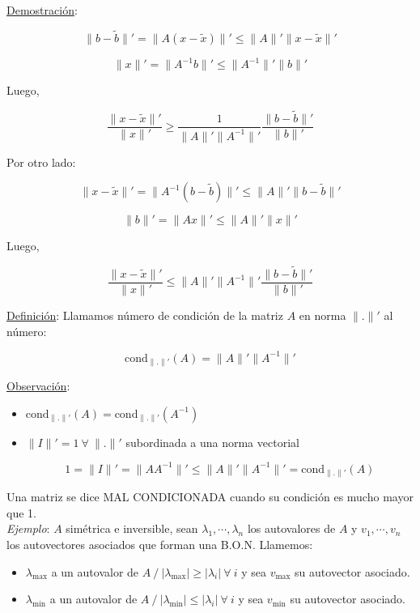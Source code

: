 \underline{Demostraci\'on}:

$$\|b - \tilde{b}\|' = \|A(x - \tilde{x})\|' \leq \|A\|'\|x - \tilde{x}\|'$$

$$\|x\|' = \|A^{-1}b\|' \leq \|A^{-1}\|'\|b\|'$$

Luego,

$$\frac{\|x - \tilde{x}\|'}{\|x\|'} \geq \frac{1}{\|A\|'\|A^{-1}\|'}\frac{\|b - \tilde{b}\|'}{\|b\|'}$$

Por otro lado:

$$\|x - \tilde{x}\|' = \|A^{-1}(b - \tilde{b})\|' \leq \|A\|'\|b - \tilde{b}\|'$$

$$\|b\|' = \|Ax\|' \leq \|A\|'\|x\|'$$

Luego,

$$\frac{\|x - \tilde{x}\|'}{\|x\|'} \leq \|A\|'\|A^{-1}\|'\frac{\|b - \tilde{b}\|'}{\|b\|'}$$


\underline{Definici\'on}: Llamamos n\'umero de condici\'on de la matriz $A$ en norma $\|.\|'$ al n\'umero: 

$$\text{cond}_{\|.\|'}(A) =  \|A\|'\|A^{-1}\|'$$

\underline{Observaci\'on}:

\begin{itemize}
	\item $\text{cond}_{\|.\|'}(A) =  \text{cond}_{\|.\|'}(A^{-1})$
	
	\item $\|I\|' = 1\ \forall \ \|.\|'$ subordinada a una norma vectorial
	
	$$1 = \|I\|' = \|AA^{-1}\|' \leq \|A\|'\|A^{-1}\|' = \text{cond}_{\|.\|'}(A)$$
\end{itemize}

Una matriz se dice MAL CONDICIONADA cuando su condici\'on es mucho mayor que 1.\\

\textit{Ejemplo}: $A$ sim\'etrica e inversible, sean $\lambda_{1}, \cdots, \lambda_{n}$ los autovalores de $A$ y $v_{1}, \cdots, v_{n}$ los autovectores asociados que forman una B.O.N. Llamemos:

\begin{itemize}
	\item $\lambda_{\max}$ a un autovalor de $A \ / \ |\lambda_{\max}| \geq |\lambda_{i}|\ \forall \ i$ y sea $v_{\max}$ su autovector asociado.
	
	\item $\lambda_{\min}$ a un autovalor de $A \ / \ |\lambda_{\min}| \leq |\lambda_{i}|\ \forall \ i$ y sea $v_{\min}$ su autovector asociado.
\end{itemize}

